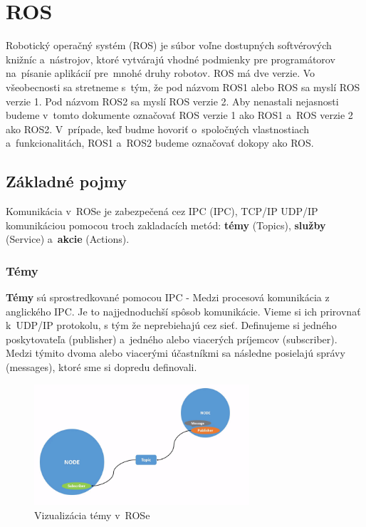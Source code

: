 \section{ROS}

\noindent Robotický operačný systém (\acrlong{ROS}) je súbor voľne dostupných softvérových knižníc a~nástrojov, ktoré vytvárajú
vhodné podmienky pre programátorov na~písanie aplikácií pre~mnohé druhy robotov. ROS má dve verzie. Vo všeobecnosti sa stretneme
s~tým, že pod názvom ROS1 alebo ROS sa myslí ROS verzie 1. Pod názvom ROS2 sa myslí ROS verzie 2. Aby nenastali nejasnosti
budeme v~tomto dokumente označovať ROS verzie 1 ako ROS1 a~ROS verzie 2 ako ROS2. V~prípade, keď budme hovoriť o~spoločných
vlastnostiach a~funkcionalitách, ROS1 a~ROS2 budeme označovať dokopy ako ROS.

\subsection{Základné pojmy}

\noindent Komunikácia v~ROSe je zabezpečená cez IPC (\acrlong{IPC}), TCP/IP UDP/IP komunikáciou pomocou troch zakladacích metód:
\textbf{témy} (Topics), \textbf{služby} (Service) a~\textbf{akcie} (Actions).

\subsubsection{Témy}

	\textbf {Témy} sú sprostredkované pomocou IPC - Medzi procesová komunikácia z anglického \acrlong{IPC}. Je to najjednoduchší spôsob
	komunikácie. Vieme si ich prirovnať k~UDP/IP protokolu, s tým že neprebiehajú cez sieť. Definujeme si jedného poskytovateľa (publisher)
	a~jedného alebo viacerých príjemcov (subscriber). Medzi týmito dvoma alebo viacerými účastníkmi sa následne posielajú správy (messages),
	ktoré sme si dopredu definovali.

	\begin{figure}[h]
		\centering
		\includegraphics[width=8cm]{img/topicsExplanation.png}
		\caption{Vizualizácia témy v~ROSe~\cite{RosDoc}}
		\label{fig:topics}
	\end{figure}

